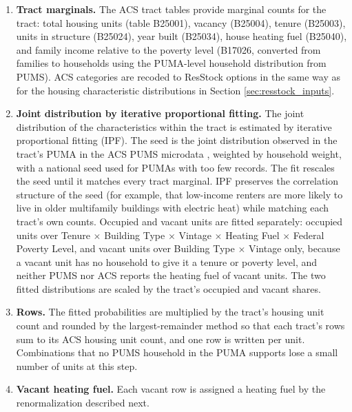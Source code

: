 \begin{enumerate}
    \item \textbf{Tract marginals.} The ACS tract tables provide marginal counts for the tract: total housing units (table B25001), vacancy (B25004), tenure (B25003), units in structure (B25024), year built (B25034), house heating fuel (B25040), and family income relative to the poverty level (B17026, converted from families to households using the PUMA-level household distribution from PUMS). ACS categories are recoded to ResStock options in the same way as for the housing characteristic distributions in Section \ref{sec:resstock_inputs}.
    \item \textbf{Joint distribution by iterative proportional fitting.} The joint distribution of the characteristics within the tract is estimated by iterative proportional fitting (IPF). The seed is the joint distribution observed in the tract's PUMA in the ACS PUMS microdata \citep{PUMS}, weighted by household weight, with a national seed used for PUMAs with too few records. The fit rescales the seed until it matches every tract marginal. IPF preserves the correlation structure of the seed (for example, that low-income renters are more likely to live in older multifamily buildings with electric heat) while matching each tract's own counts. Occupied and vacant units are fitted separately: occupied units over Tenure $\times$ Building Type $\times$ Vintage $\times$ Heating Fuel $\times$ Federal Poverty Level, and vacant units over Building Type $\times$ Vintage only, because a vacant unit has no household to give it a tenure or poverty level, and neither PUMS nor ACS reports the heating fuel of vacant units. The two fitted distributions are scaled by the tract's occupied and vacant shares.
    \item \textbf{Rows.} The fitted probabilities are multiplied by the tract's housing unit count and rounded by the largest-remainder method so that each tract's rows sum to its ACS housing unit count, and one row is written per unit. Combinations that no PUMS household in the PUMA supports lose a small number of units at this step.
    \item \textbf{Vacant heating fuel.} Each vacant row is assigned a heating fuel by the renormalization described next.
\end{enumerate}

